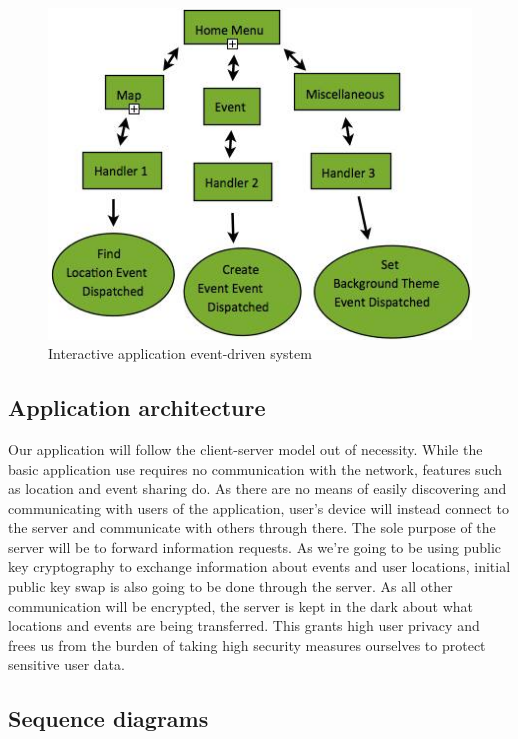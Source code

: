 \documentclass[10pt,a4paper,oneside]{report}
\begin{document}
\begin{figure}[H]
 \centering
 \includegraphics[keepaspectratio, width=\textwidth]{event.png}
 \caption{Interactive application event-driven system}
\end{figure}

\subsection*{Application architecture}
Our application will follow the client-server model out of necessity. While the basic application use requires no communication with the network, features such as location and event sharing do. As there are no means of easily discovering and communicating with users of the application, user's device will instead connect to the server and communicate with others through there. The sole purpose of the server will be to forward information requests. As we're going to be using public key cryptography to exchange information about events and user locations, initial public key swap is also going to be done through the server. As all other communication will be encrypted, the server is kept in the dark about what locations and events are being transferred. This grants high user privacy and frees us from the burden of taking high security measures ourselves to protect sensitive user data.

\subsection*{Sequence diagrams}
\end{document}
